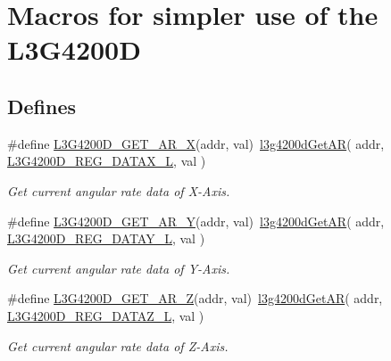 \hypertarget{group___l3_g42000_d___m_a_c_r_o_s}{\section{\-Macros for simpler use of the \-L3\-G4200\-D}
\label{group___l3_g42000_d___m_a_c_r_o_s}
}
\subsection*{\-Defines}
\begin{DoxyCompactItemize}
\item 
\hypertarget{group___l3_g42000_d___m_a_c_r_o_s_ga4db6cd41beda3bd6d833363cf08d9883}{\#define \hyperlink{group___l3_g42000_d___m_a_c_r_o_s_ga4db6cd41beda3bd6d833363cf08d9883}{\-L3\-G4200\-D\-\_\-\-G\-E\-T\-\_\-\-A\-R\-\_\-\-X}(addr, val)~\hyperlink{l3g4200d_8h_ac6df9b08eeb0cd116b8346916a286fa2}{l3g4200d\-Get\-A\-R}( addr, \hyperlink{group___l3_g4200_d___r_e_g_i_s_t_e_r_s_gafbad426ec9eafa3e09f42dd2ed2a0736}{\-L3\-G4200\-D\-\_\-\-R\-E\-G\-\_\-\-D\-A\-T\-A\-X\-\_\-\-L}, val )}\label{group___l3_g42000_d___m_a_c_r_o_s_ga4db6cd41beda3bd6d833363cf08d9883}

\begin{DoxyCompactList}\small\item\em \-Get current angular rate data of \-X-\/\-Axis. \end{DoxyCompactList}\item 
\hypertarget{group___l3_g42000_d___m_a_c_r_o_s_ga78a08bfdbe423c8a209842b4ce62aa14}{\#define \hyperlink{group___l3_g42000_d___m_a_c_r_o_s_ga78a08bfdbe423c8a209842b4ce62aa14}{\-L3\-G4200\-D\-\_\-\-G\-E\-T\-\_\-\-A\-R\-\_\-\-Y}(addr, val)~\hyperlink{l3g4200d_8h_ac6df9b08eeb0cd116b8346916a286fa2}{l3g4200d\-Get\-A\-R}( addr, \hyperlink{group___l3_g4200_d___r_e_g_i_s_t_e_r_s_ga7a1702cabf5046f28ce3824e4ae9f8a9}{\-L3\-G4200\-D\-\_\-\-R\-E\-G\-\_\-\-D\-A\-T\-A\-Y\-\_\-\-L}, val )}\label{group___l3_g42000_d___m_a_c_r_o_s_ga78a08bfdbe423c8a209842b4ce62aa14}

\begin{DoxyCompactList}\small\item\em \-Get current angular rate data of \-Y-\/\-Axis. \end{DoxyCompactList}\item 
\hypertarget{group___l3_g42000_d___m_a_c_r_o_s_gafb627a39e1a5630675b015164acfa689}{\#define \hyperlink{group___l3_g42000_d___m_a_c_r_o_s_gafb627a39e1a5630675b015164acfa689}{\-L3\-G4200\-D\-\_\-\-G\-E\-T\-\_\-\-A\-R\-\_\-\-Z}(addr, val)~\hyperlink{l3g4200d_8h_ac6df9b08eeb0cd116b8346916a286fa2}{l3g4200d\-Get\-A\-R}( addr, \hyperlink{group___l3_g4200_d___r_e_g_i_s_t_e_r_s_ga59b07ccd68c25b0343eaed5988f12028}{\-L3\-G4200\-D\-\_\-\-R\-E\-G\-\_\-\-D\-A\-T\-A\-Z\-\_\-\-L}, val )}\label{group___l3_g42000_d___m_a_c_r_o_s_gafb627a39e1a5630675b015164acfa689}

\begin{DoxyCompactList}\small\item\em \-Get current angular rate data of \-Z-\/\-Axis. \end{DoxyCompactList}\end{DoxyCompactItemize}
